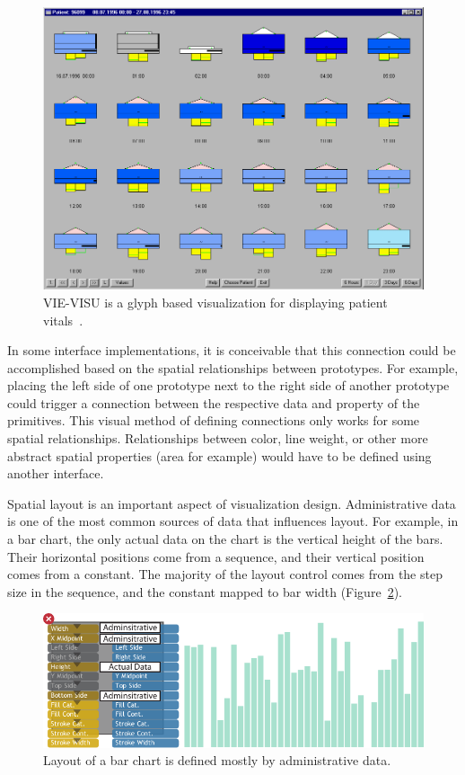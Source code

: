 \begin{figure}[t]
\centering
\includegraphics[width=\textwidth]{images/vieVisu.png}
\caption{VIE-VISU is a glyph based visualization for displaying patient vitals~\cite{Horn1998}.}
\label{fig:vieVisu}
\end{figure}

In some interface implementations, it is conceivable that this connection could be accomplished based on the spatial relationships between prototypes.
For example, placing the left side of one prototype next to the right side of another prototype could trigger a connection between the respective data and property of the primitives.
This visual method of defining connections only works for some spatial relationships. Relationships between color, line weight, or other more abstract spatial properties (area for example) would have to be defined using another interface.

\label{axesLayout}

Spatial layout is an important aspect of visualization design.
Administrative data is one of the most common sources of data that influences layout.
For example, in a bar chart, the only actual data on the chart is the vertical height of the bars.
Their horizontal positions come from a sequence, and their vertical position comes from a constant.
The majority of the layout control comes from the step size in the sequence, and the constant mapped to bar width (Figure~\ref{fig:layout}).

\begin{figure}[t]
\centering
\includegraphics[width=\textwidth]{images/layout.pdf}
\caption{Layout of a bar chart is defined mostly by administrative data.}
\label{fig:layout}
\end{figure}

